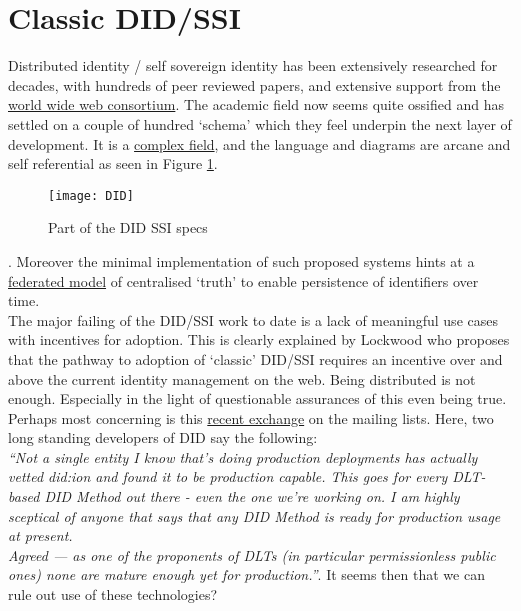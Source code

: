 \section{Classic DID/SSI}
Distributed identity / self sovereign identity has been extensively researched for decades, with hundreds of peer reviewed papers, and extensive support from the \href{https://www.w3.org/TR/did-core/}{world wide web consortium}. The academic field now seems quite ossified and has settled on a couple of hundred `schema' which they feel underpin the next layer of development. It is a \href{https://medium.com/decentralized-identity/overview-of-decentralized-identity-standards-f82efd9ab6c7}{complex field}, and the language and diagrams are arcane and self referential as seen in Figure \ref{fig:DID}.
\begin{figure}
\texttt{[image: DID]}
  \caption{Part of the DID SSI specs}
  \label{fig:DID}
\end{figure}. 
Moreover the minimal implementation of such proposed systems hints at a \href{https://www.w3.org/community/perma-id/}{federated model} of centralised `truth' to enable persistence of identifiers over time.\\
The major failing of the DID/SSI work to date is a lack of meaningful use cases with incentives for adoption. This is clearly explained by Lockwood \cite{lockwood2021exploring} who proposes that the pathway to adoption of `classic' DID/SSI requires an incentive over and above the current identity management on the web. Being distributed is not enough. Especially in the light of questionable assurances of this even being true.\\
Perhaps most concerning is this \href{https://lists.w3.org/Archives/Public/public-credentials/2022Mar/thread.html}{recent exchange} on the mailing lists. Here, two long standing developers of DID say the following:\\
\textit{``Not a single entity I know that's doing production deployments has actually vetted did:ion and found it to be production capable. This goes for every DLT-based DID Method out there - even the one we're working on. I am highly sceptical of anyone that says that any DID Method is ready for production usage at present.\\
Agreed — as one of the proponents of DLTs (in particular permissionless public ones) none are mature enough yet for production.''}.
It seems then that we can rule out use of these technologies?

